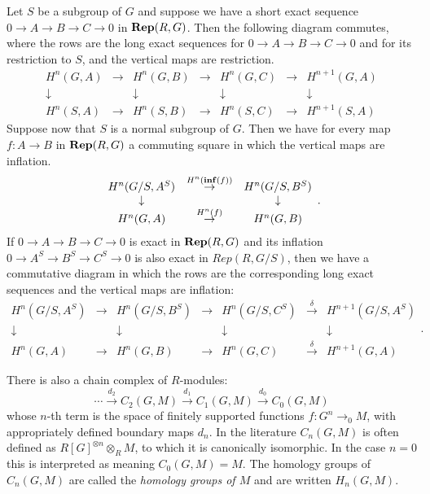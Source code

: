 \begin{lemma} \label{lem:inflation restriction naturality}
	\leanok
	Let $S$ be a subgroup of $G$ and suppose we have a short exact sequence
	$0 \to A \to B \to C \to 0$ in $\mathbf{Rep}(R,G)$.
	Then the following diagram commutes, where the rows are the long exact sequences
	for $0 \to A \to B \to C \to 0$ and for its restriction to $S$,
	and the vertical maps are restriction.
	\[
  	\begin{array}{ccccccc}
			H^n(G,A) & \to & H^n(G,B) &\to &H^n(G,C)& \to& H^{n+1}(G,A)\\
			\downarrow&&\downarrow&&\downarrow&&\downarrow \\
			H^n(S,A) & \to & H^n(S,B) &\to &H^n(S,C)& \to& H^{n+1}(S,A)
		\end{array}
  \]
	Suppose now that $S$ is a normal subgroup of $G$. Then we have for every
	map $f : A \to B$ in $\mathbf{Rep}(R,G)$ a commuting square in which the vertical maps are inflation.
	\[
  	\begin{array}{ccccccc}
			H^n(G/S,A^S) & \stackrel{H^n(\mathbf{inf}(f))}\to & H^n(G/S,B^S)\\
			\downarrow&&\downarrow \\
			H^n(G,A) & \stackrel{H^n(f)}\to & H^n(G,B)
		\end{array}.
	\]
	If $0 \to A \to B \to C \to 0$ is exact in $\mathbf{Rep}(R,G)$ and its inflation
	$0 \to A^S \to B^S \to C^S \to 0$ is also exact in $Rep(R,G/S)$, then
	we have a commutative diagram in which the rows are the corresponding long exact
	sequences and the vertical maps are inflation:
	\[
  	\begin{array}{ccccccc}
			H^n(G/S,A^S) & \to & H^n(G/S,B^S) &\to &H^n(G/S,C^S)& \stackrel{\delta}\to& H^{n+1}(G/S,A^S)\\
			\downarrow&&\downarrow&&\downarrow&&\downarrow \\
			H^n(G,A) & \to & H^n(G,B) &\to &H^n(G,C)& \stackrel{\delta}\to& H^{n+1}(G,A)
		\end{array}.
  \]
\end{lemma}

\begin{definition} \label{def:group homology}
	There is also a chain complex of $R$-modules:
	\[
		\cdots \stackrel{d_2}\to C_2(G,M) \stackrel{d_1}\to C_1(G,M) \stackrel{d_0}\to C_0(G,M)
	\]
	whose $n$-th term is the space of finitely supported functions
	$f : G^n \to_0 M$, with appropriately defined boundary maps $d_n$.
	In the literature $C_n(G,M)$ is often defined as $R[G]^{\otimes n} \otimes_R M$, to which it is
	canonically isomorphic.
	In the case $n=0$ this is interpreted as meaning $C_0(G,M) = M$.
	The homology groups of $C_n(G,M)$ are called the \emph{homology groups of $M$}
	and are written $H_n(G,M)$.
\end{definition}

